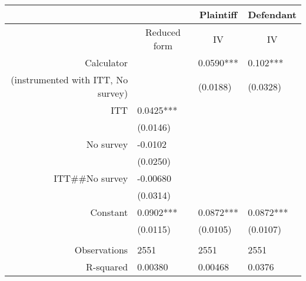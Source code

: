\begin{tabular}{rrrr}
\toprule
      &       & \multicolumn{1}{c}{Plaintiff} & \multicolumn{1}{c}{Defendant} \\
\midrule
      & \multicolumn{1}{c}{Reduced form} & \multicolumn{1}{c}{IV} & \multicolumn{1}{c}{IV} \\
Calculator & \multicolumn{1}{l}{} & \multicolumn{1}{l}{0.0590***} & \multicolumn{1}{l}{0.102***} \\
 (instrumented with ITT, No survey) & \multicolumn{1}{l}{} & \multicolumn{1}{l}{(0.0188)} & \multicolumn{1}{l}{(0.0328)} \\
ITT   & \multicolumn{1}{l}{0.0425***} & \multicolumn{1}{l}{} & \multicolumn{1}{l}{} \\
      & \multicolumn{1}{l}{(0.0146)} & \multicolumn{1}{l}{} & \multicolumn{1}{l}{} \\
No survey & \multicolumn{1}{l}{-0.0102} & \multicolumn{1}{l}{} & \multicolumn{1}{l}{} \\
      & \multicolumn{1}{l}{(0.0250)} & \multicolumn{1}{l}{} & \multicolumn{1}{l}{} \\
ITT\#\#No survey & \multicolumn{1}{l}{-0.00680} & \multicolumn{1}{l}{} & \multicolumn{1}{l}{} \\
      & \multicolumn{1}{l}{(0.0314)} & \multicolumn{1}{l}{} & \multicolumn{1}{l}{} \\
Constant & \multicolumn{1}{l}{0.0902***} & \multicolumn{1}{l}{0.0872***} & \multicolumn{1}{l}{0.0872***} \\
      & \multicolumn{1}{l}{(0.0115)} & \multicolumn{1}{l}{(0.0105)} & \multicolumn{1}{l}{(0.0107)} \\
      & \multicolumn{1}{l}{} & \multicolumn{1}{l}{} & \multicolumn{1}{l}{} \\
Observations & \multicolumn{1}{l}{2551} & \multicolumn{1}{l}{2551} & \multicolumn{1}{l}{2551} \\
R-squared & \multicolumn{1}{l}{0.00380} & \multicolumn{1}{l}{0.00468} & \multicolumn{1}{l}{0.0376} \\
\bottomrule
\end{tabular}%
